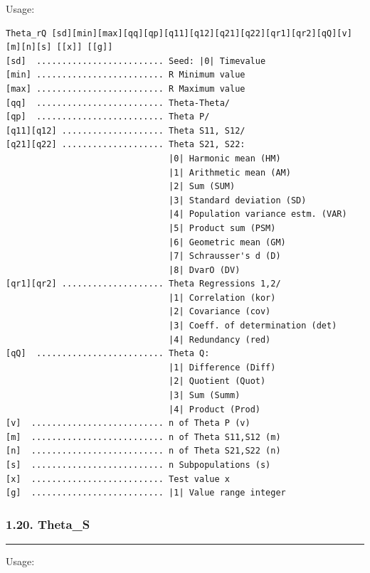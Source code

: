 \documentclass[
]{article}
\begin{document}
Usage:

\begin{verbatim}
Theta_rQ [sd][min][max][qq][qp][q11][q12][q21][q22][qr1][qr2][qQ][v]
[m][n][s] [[x]] [[g]]
[sd]  ......................... Seed: |0| Timevalue
[min] ......................... R Minimum value
[max] ......................... R Maximum value
[qq]  ......................... Theta-Theta/
[qp]  ......................... Theta P/
[q11][q12] .................... Theta S11, S12/
[q21][q22] .................... Theta S21, S22:
                                |0| Harmonic mean (HM)
                                |1| Arithmetic mean (AM)
                                |2| Sum (SUM)
                                |3| Standard deviation (SD)
                                |4| Population variance estm. (VAR)
                                |5| Product sum (PSM)
                                |6| Geometric mean (GM)
                                |7| Schrausser's d (D)
                                |8| DvarO (DV)
[qr1][qr2] .................... Theta Regressions 1,2/
                                |1| Correlation (kor)
                                |2| Covariance (cov)
                                |3| Coeff. of determination (det)
                                |4| Redundancy (red)
[qQ]  ......................... Theta Q:
                                |1| Difference (Diff)
                                |2| Quotient (Quot)
                                |3| Sum (Summ)
                                |4| Product (Prod)
[v]  .......................... n of Theta P (v)
[m]  .......................... n of Theta S11,S12 (m)
[n]  .......................... n of Theta S21,S22 (n)
[s]  .......................... n Subpopulations (s)
[x]  .......................... Test value x
[g]  .......................... |1| Value range integer
\end{verbatim}

\hypertarget{theta_s}{%
\subsubsection{1.20. Theta\_S}\label{theta_s}}

\begin{center}\rule{0.5\linewidth}{0.5pt}\end{center}

Usage:
\end{document}
